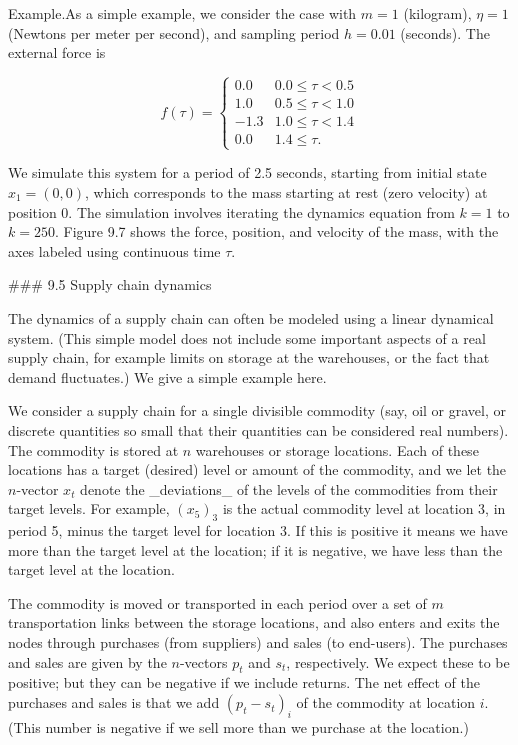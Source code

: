 
Example.As a simple example, we consider the case with \(m=1\) (kilogram), \(\eta=1\) (Newtons per meter per second), and sampling period \(h=0.01\) (seconds). The external force is

\[f(\tau)=\left\{\begin{array}{rl}0.0&0.0\leq\tau<0.5\\ 1.0&0.5\leq\tau<1.0\\ -1.3&1.0\leq\tau<1.4\\ 0.0&1.4\leq\tau.\end{array}\right.\]

We simulate this system for a period of 2.5 seconds, starting from initial state \(x_{1}=(0,0)\), which corresponds to the mass starting at rest (zero velocity) at position 0. The simulation involves iterating the dynamics equation from \(k=1\) to \(k=250\). Figure 9.7 shows the force, position, and velocity of the mass, with the axes labeled using continuous time \(\tau\).

### 9.5 Supply chain dynamics

The dynamics of a supply chain can often be modeled using a linear dynamical system. (This simple model does not include some important aspects of a real supply chain, for example limits on storage at the warehouses, or the fact that demand fluctuates.) We give a simple example here.

We consider a supply chain for a single divisible commodity (say, oil or gravel, or discrete quantities so small that their quantities can be considered real numbers). The commodity is stored at \(n\) warehouses or storage locations. Each of these locations has a target (desired) level or amount of the commodity, and we let the \(n\)-vector \(x_{t}\) denote the _deviations_ of the levels of the commodities from their target levels. For example, \((x_{5})_{3}\) is the actual commodity level at location 3, in period 5, minus the target level for location 3. If this is positive it means we have more than the target level at the location; if it is negative, we have less than the target level at the location.

The commodity is moved or transported in each period over a set of \(m\) transportation links between the storage locations, and also enters and exits the nodes through purchases (from suppliers) and sales (to end-users). The purchases and sales are given by the \(n\)-vectors \(p_{t}\) and \(s_{t}\), respectively. We expect these to be positive; but they can be negative if we include returns. The net effect of the purchases and sales is that we add \((p_{t}-s_{t})_{i}\) of the commodity at location \(i\). (This number is negative if we sell more than we purchase at the location.)

